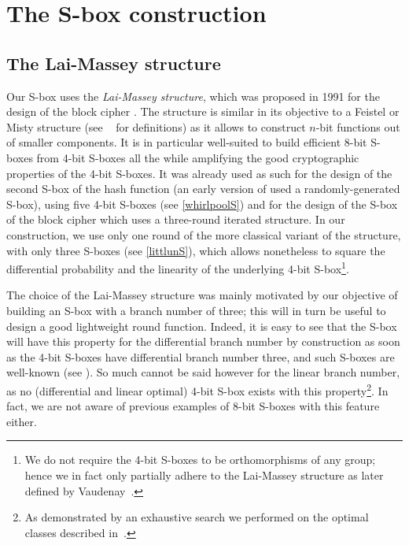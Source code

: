 \section{The \littlun S-box construction}
\label{sec:litt}


\subsection{The Lai-Massey structure}
Our S-box uses the \emph{Lai-Massey structure}, which was proposed in 1991 for the design
of the block cipher \idea \cite{idea}. The structure is similar in its objective to a Feistel or Misty structure
(see \eg{}~\cite{sac15} for definitions)
as it allows to construct $n$-bit functions out of smaller components. It is in particular well-suited
to build efficient 8-bit S-boxes from 4-bit S-boxes all the while amplifying the good cryptographic
properties of the 4-bit S-boxes.
It was already used as such for the design of the second S-box of the \whirlpool hash function
\cite{whirlpool} (an early version of \whirlpool used a randomly-generated S-box), using five
4-bit S-boxes (see \autoref{whirlpoolS})
and for the design of the S-box of the \fox block cipher \cite{fox} which uses a three-round iterated structure.
In our construction, we use only one round of the more classical variant of the structure, with only three S-boxes
(see \autoref{littlunS}), which allows nonetheless to square the differential probability
and the linearity of the underlying 4-bit S-box\footnote{We do not require the 4-bit S-boxes to
be orthomorphisms of any group; hence we in fact only partially adhere to the Lai-Massey structure as later defined
by Vaudenay~\cite{vaudmassey}.}.

The choice of the Lai-Massey structure was mainly motivated by our objective of building
an S-box with a branch number of three; this will in turn be useful to design a good lightweight round function.
Indeed, it is easy to see that the S-box will
have this property for the differential branch number by construction as soon as the 4-bit S-boxes have differential branch number three,
and such S-boxes are well-known (see \eg \serpent \cite{serpent}). So much cannot be said however for
the linear branch number, as no (differential and linear optimal) 4-bit S-box exists with this property\footnote{As
demonstrated by an exhaustive search we performed on the optimal classes described \eg{} in~\cite{class4bit}.}. In fact, we are not aware
of previous examples of 8-bit S-boxes with this feature either.

